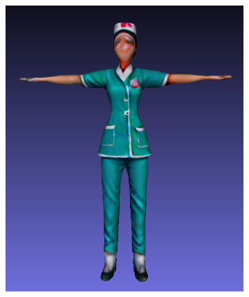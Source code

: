 \begin{figure}[H]
\begin{subfigure}[b]{0.26\textwidth}
        \includegraphics[width=\textwidth]{figures/future/bias_nurse_genie_3.png}
        \caption{}
    \end{subfigure}
    \begin{subfigure}[b]{0.232\textwidth}
        \centering

\end{subfigure}
\end{figure}
